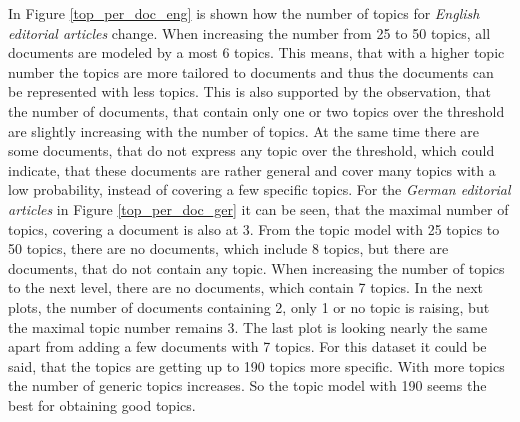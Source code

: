 In Figure \ref{top_per_doc_eng} is shown how the number of topics for \textit{English editorial articles} change. When increasing the number from 25 to 50 topics, all documents are modeled by a most 6 topics. This means, that with a higher topic number the topics are more tailored to documents and thus the documents can be represented with less topics. This is also supported by the observation, that the number of documents, that contain only one or two topics over the threshold are slightly increasing with the number of topics. At the same time there are some documents, that do not express any topic over the threshold, which could indicate, that these documents are rather general and cover many topics with a low probability, instead of covering a few specific topics.
For the \textit{German editorial articles} in Figure \ref{top_per_doc_ger} it can be seen, that the maximal number of topics, covering a document is also at 3. From the topic model with 25 topics to 50 topics, there are no documents, which include 8 topics, but there are documents, that do not contain any topic. When increasing the number of topics to the next level, there are no documents, which contain 7 topics. In the next plots, the number of documents containing 2, only 1 or no topic is raising, but the maximal topic number remains 3. The last plot is looking nearly the same apart from adding a few documents with 7 topics. For this dataset it could be said, that the topics are getting up to 190 topics more specific. With more topics the number of generic topics increases. So the topic model with 190 seems the best for obtaining good topics.


